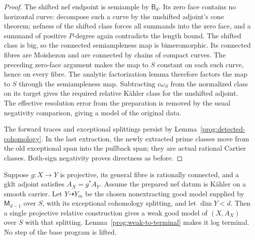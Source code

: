 \begin{proof}
The shifted nef endpoint is semiample by $\mathsf B_d$. Its zero face
contains no horizontal curve: decompose such a curve by the unshifted
adjoint's cone theorem; nefness of the shifted class forces all
summands into the zero face, and a summand of positive $P$-degree again
contradicts the length bound. The shifted class is big, so the
connected semiampleness map is bimeromorphic. Its connected fibres are Moishezon and are connected
by chains of compact curves. The preceding zero-face argument makes
the map to $S$ constant on each such curve, hence on every fibre.
The analytic factorization lemma therefore factors the map to $S$
through the semiampleness map. Subtracting $c\omega_S$ from the
normalized class on its target gives the required relative K\"ahler class for the unshifted adjoint. The effective
resolution error from the preparation is removed by the usual
negativity comparison, giving a model of the original data.

The forward traces and exceptional splittings persist by
Lemma~\ref{prog:detected-cohomology}. In the last extraction,
the newly extracted prime classes move from the old exceptional span
into the pullback span; they are actual rational Cartier classes.
Both-sign negativity proves directness as before.
\end{proof}

\begin{lemma}
\label{prog:graph-good-model}
Suppose $g:X\to Y$ is projective, its general fibre is rationally
connected, and a gklt adjoint satisfies $A_X=g^*A_Y$. Assume the
prepared nef datum is K\"ahler on a smooth carrier. Let
$Y\dashrightarrow Y_m$ be the chosen nonextracting good model
supplied by $\mathsf M_{d-1}$ over $S$, with its exceptional
cohomology splitting, and let $\dim Y<d$. Then a single projective relative construction gives a weak good model of $(X,A_X)$ over $S$ with that splitting.
Lemma~\ref{prog:weak-to-terminal} makes it log terminal. No step
of the base program is lifted.
\end{lemma}

